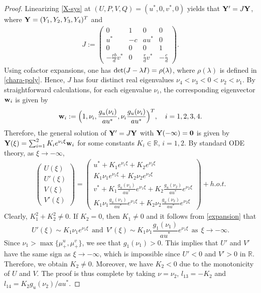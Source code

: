 \documentclass[11pt,a4paper]{article}
\numberwithin{equation}{section}
\numberwithin{figure}{section}
\newcommand\bea{\begin{eqnarray}}
\newcommand\eea{\end{eqnarray}}
\newcommand\beaa{\begin{eqnarray*}}
\newcommand\eeaa{\end{eqnarray*}}
\begin{document}
\begin{proof}
Linearizing \eqref{X-sys} at $(U,P,V,Q)=(u^*,0,v^*,0)$ yields that ${\bf Y}'=J {\bf Y}$, where
${\bf Y}=(Y_1,Y_2,Y_3,Y_4)^T$ and
\beaa
J:=
\left(\begin{array}{cccc} 0 & 1 & 0 & 0\\
                       u^* & -c & au^* & 0\\
                       0 & 0 & 0 & 1 \\
                       -\frac{rb}{d}v^* & 0 & \frac{r}{d}v^* & -\frac{c}{d}
                       \end{array}\right).
\eeaa
Using cofactor expansions, one has ${\rm det}(J-\lambda I)=\rho(\lambda)$,
where $\rho(\lambda)$ is defined in \eqref{chara-poly}. Hence,
$J$ has four distinct real eigenvalues $\nu_4<\nu_3<0<\nu_2<\nu_1$.
By straightforward calculations, for each eigenvalue $\nu_i$, the corresponding eigenvector ${\bf w}_i$ is given by
\beaa%
{\bf w}_i:=\Big(1,\nu_i,\frac{g_u(\nu_i)}{au^*},\nu_i \frac{g_u(\nu_i)}{au^*}\Big)^T,\quad i=1,2,3,4.
\eeaa
Therefore, the general solution of ${\bf Y}'=J {\bf Y}$ with ${\bf Y}(-\infty)={\bf 0}$ is given by
${\bf Y}(\xi)=\sum_{i=1}^{2}K_i  e^{\nu_i\xi}{\bf w}_i$ for some constants $K_i\in\mathbb{R}$, $i=1,2$.
By standard ODE theory, as $\xi\to-\infty$,
\bea\label{expansion}
\left(\begin{array}{c} U(\xi)\\ U'(\xi) \\ V(\xi) \\V'(\xi) \end{array}\right)=
\left(\begin{array}{c} u^*+K_1  e^{\nu_1\xi}+K_2  e^{\nu_2\xi} \\
                            K_1  \nu_1 e^{\nu_1\xi}+ K_2 \nu_2 e^{\nu_2\xi}\\
                         v^*+K_1 \frac{g_u(\nu_1)}{au^*}   e^{\nu_1\xi}+K_2 \frac{g_u(\nu_2)}{au^*}   e^{\nu_2\xi}\\
                              K_1 \nu_1\frac{g_u(\nu_1)}{au^*} e^{\nu_1\xi}+K_2 \nu_2\frac{g_u(\nu_2)}{au^*}   e^{\nu_2\xi}
                              \end{array}\right)+h.o.t.
\eea
Clearly, $K_1^2+K_2^2\neq0$. If $K_2=0$, then
$K_1\neq0$  and it follows from
\eqref{expansion} that 
$$U'(\xi)\sim K_1  \nu_1 e^{\nu_1\xi}\ \ \text{and}\ \ V'(\xi)\sim K_1 \nu_1\frac{g_1(\nu_1)}{au^*} e^{\nu_1\xi}\ \ \text{as}\ \ \xi\to-\infty.$$
Since $\nu_1>\max\{\mu^u_+, \mu^v_+\}$, we see that $g_1(\nu_1)>0$.
This implies that $U'$ and $V'$ have the same sign as $\xi\to -\infty$,
which is impossible since
$U'<0$ and $V'>0$ in $\mathbb{R}$. Therefore, we obtain $K_2\neq0$. Moreover,
we have $K_2<0$ due to the monotonicity of $U$ and $V$.
The proof is thus complete by taking $\nu=\nu_2$, $l_{13}=-K_2$ and $l_{14}=K_2 g_u(\nu_2)/au^*$.
\end{proof}
\end{document}
